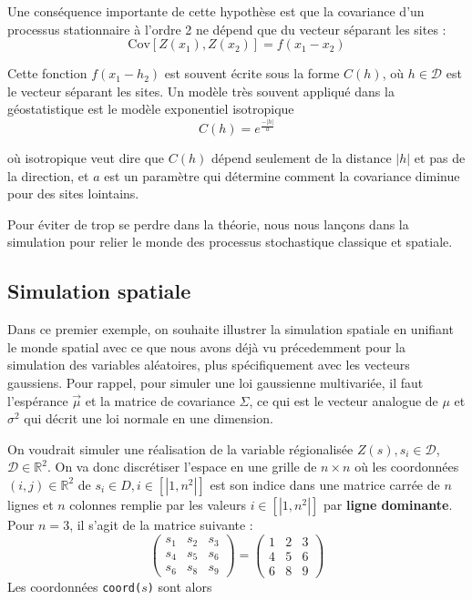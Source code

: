 \documentclass[10pt]{article} %
\begin{document}
Une conséquence importante de cette hypothèse est que la covariance d'un processus stationnaire à l'ordre 2 ne dépend que du vecteur séparant les sites :
    $$ \mathrm{Cov}[Z(x_1), Z(x_2)] = f(x_1 - x_2) $$

Cette fonction $f(x_1 - h_2)$ est souvent écrite sous la forme $C(h)$, où $h \in \mathcal{D}$ est le vecteur séparant les sites. Un modèle très souvent appliqué dans la géostatistique est le modèle exponentiel isotropique
$$ C(h) = e^{\frac{-|h|}{a}} $$

où isotropique veut dire que $C(h)$ dépend seulement de la distance $|h|$ et pas de la direction, et $a$ est un paramètre qui détermine comment la covariance diminue pour des sites lointains.

Pour éviter de trop se perdre dans la théorie, nous nous lan\c cons dans la simulation pour relier le monde des processus stochastique classique et spatiale.

\subsection{Simulation spatiale}

Dans ce premier exemple, on souhaite illustrer la simulation spatiale en unifiant le monde spatial avec ce que nous avons déjà vu précedemment pour la simulation des variables aléatoires,
plus spécifiquement avec les vecteurs gaussiens. Pour rappel, pour simuler une loi gaussienne multivariée, il faut l'espérance $\vec\mu$ et la matrice de covariance $\Sigma$,
ce qui est le vecteur analogue de $\mu$ et $\sigma^2$ qui décrit une loi normale en une dimension.

On voudrait simuler une réalisation de la variable régionalisée $Z(s), s_i \in \mathcal{D}$, $\mathcal{D} \in \mathbb{R}^2$.
On va donc discrétiser l'espace en une grille de $n \times n$ où les coordonnées
$(i, j) \in \mathbb{R}^2$ de $s_i \in D, i \in [|1, n^2|]$ est son indice dans une matrice carrée de $n$ lignes et $n$
colonnes remplie par les valeurs $i \in [|1, n^2|]$ par \textbf{ligne dominante}. Pour $n = 3$, il s'agit de la matrice suivante :
$$
    \begin{pmatrix}
        s_1 & s_2 & s_3 \\
        s_4 & s_5 & s_6 \\
        s_6 & s_8 & s_9
    \end{pmatrix}
    =
    \begin{pmatrix}
        1 & 2 & 3 \\
        4 & 5 & 6 \\
        6 & 8 & 9
    \end{pmatrix}
$$
Les coordonnées \texttt{coord($s$)} sont alors
\end{document}

